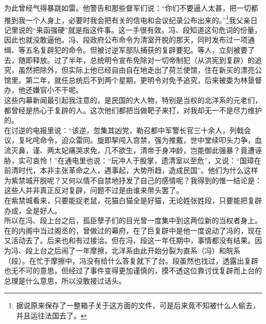 为此曾经气得暴跳如雷。他警告和那些督军们说：“你们不要逼人太甚，把一切都推到我一个人身上，必要时我会把有关的信电和会议纪录公布出来的。”\footnote{据说原来保存了一整箱子关于这方面的文件，可是后来竟不知被什么人偷去，并且运往法国去了。}我父亲日记里说的“来函强硬”就是指这件事。这一手很有效。冯、段知道这句危词的份量，因此也就没敢逼他。冯、段政府公布命令为清室开脱的那天，同时发布过一项通缉、等五名复辟犯的命令。但被讨逆军部队捕获的复辟要犯。等人，立刻被要了去，随即释放。过了半年，总统明令宣布免除对一切帝制犯（从洪宪到复辟）的追究，虽然把除外，但实际上他已经自由自在地走出了荷兰使馆，住在新买的漂亮公馆里。第二年，就任总统后不到两个星期，更明令对免予追究，后来被委为林垦督办，他还嫌官小不干呢。\\

这些内幕新闻最引起我注意的，是民国的大人物，特别是当权的北洋系的元老们，都曾经是热心于复辟的人。这次他们都把当做靶子来打，对我却无一不是尽力维护的。\\

在讨逆的电报里说：“该逆，忽集其凶党，勒召都中军警长官三十余人，列戟会议，复叱咤命令，迫众雷同。旋即挈闯入宫禁，强为推戴，世中堂续叩头力争，血流灭鼻，谨、两太妃痛哭求免，几不欲生，清帝于身冲龄，岂能御此强暴？竟遭诬胁，实可哀怜！”在通电里也说：“玩冲人于股掌，遗清室以至危”，又说：“国璋在前清时代，本非主张革命之人，遇事起，大势所趋，造成民国”。他们为什么这样为紫禁城开脱呢？又何以情不自禁地抒发了自己的感情呢？我得到的惟一结论是：这些人并非真正反对复辟，问题不过是由谁来带头罢了。\\

在紫禁城看来，只要能捉老鼠，花猫白猫全是好猫，无论姓张姓段，只要能把复辟办成，全是好人。\\

所以在冯、段上台之后，孤臣孽子们的目光曾一度集中到这两位新的当权者身上。在的内阁中当过阁丞的，曾做过的幕府，在了巨复辟中是他一度说动了冯的，现在又活动去了。后来也和有过接洽。但在冯、段这一年任期中，事情都没有结果。因为冯、段上台之后闹了一年摩擦，北洋系由此开始分裂为直系（冯）和皖系（段）。在忙于摩擦中，冯没有给什么答复就下了台。段虽然也找过，透露出复辟也无不可的意思，但经过了事件变得更加谨慎的，摸不透这位靠讨伐复辟而上台的总理是什么意思，所以没敢接过话头。\\

